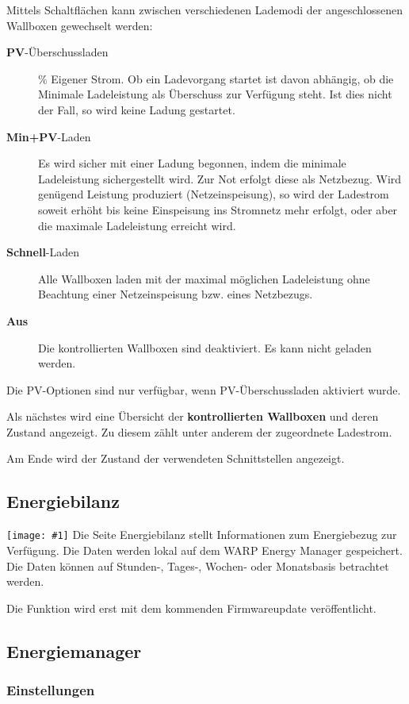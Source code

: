 \documentclass[a4paper,10pt]{article}
\newcommand{\gfx}[1]{\texttt{[image: \#1]}}
\begin{document}
\begin{multicols*}{2}
	Mittels Schaltflächen kann zwischen verschiedenen Lademodi der angeschlossenen 
	Wallboxen gewechselt werden:
	\begin{description}
	\item[\textbf{PV}-Überschussladen] \% Eigener Strom\grqq. Ob ein
	Ladevorgang startet ist davon abhängig, ob die Minimale Ladeleistung
	als Überschuss zur Verfügung steht. Ist dies nicht der Fall, so
	wird keine Ladung gestartet.
	\item[\textbf{Min+PV}-Laden] Es wird sicher mit einer Ladung begonnen, indem 
	die minimale Ladeleistung sichergestellt wird. Zur Not erfolgt diese als
	Netzbezug. Wird genügend Leistung produziert (Netzeinspeisung), so wird
	der Ladestrom soweit erhöht bis keine Einspeisung ins Stromnetz mehr
	erfolgt, oder aber die maximale Ladeleistung erreicht wird.
	\item[\textbf{Schnell}-Laden] Alle Wallboxen laden mit der maximal möglichen
	Ladeleistung ohne Beachtung einer Netzeinspeisung bzw. eines Netzbezugs.
	\item[\textbf{Aus}] Die kontrollierten Wallboxen sind deaktiviert. Es kann
	nicht geladen werden.
	\end{description}
	Die PV-Optionen sind nur verfügbar, wenn PV-Überschussladen aktiviert wurde.

	Als nächstes wird eine Übersicht der \textbf{kontrollierten Wallboxen} und deren
	Zustand angezeigt. Zu diesem zählt unter anderem der zugeordnete Ladestrom.

	Am Ende wird der Zustand der verwendeten Schnittstellen angezeigt.

	\subsection{Energiebilanz}

	\gfx{./img/resized/web_em_energy_analysis}
	Die Seite Energiebilanz stellt Informationen zum Energiebezug zur Verfügung.
	Die Daten werden lokal auf dem WARP Energy Manager gespeichert. Die Daten
	können auf Stunden-, Tages-, Wochen- oder Monatsbasis betrachtet werden.

	Die Funktion wird erst mit dem kommenden Firmwareupdate veröffentlicht.

	\subsection{Energiemanager}
	\subsubsection{Einstellungen}


\end{multicols*}
\end{document}
